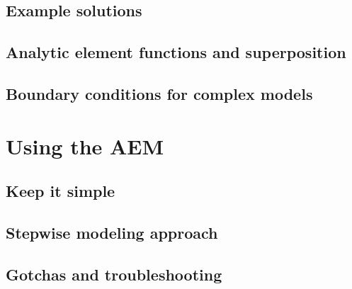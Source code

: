 \subsection{Example solutions}


\subsection{Analytic element functions and superposition}


\subsection{Boundary conditions for complex models}


\section{Using the AEM}


\subsection{Keep it simple}


\subsection{Stepwise modeling approach}


\subsection{Gotchas and troubleshooting}
